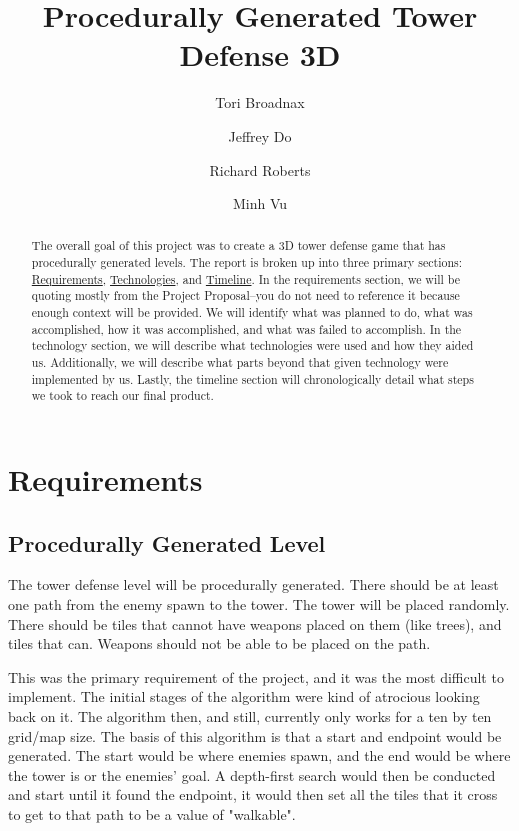 \documentclass{article}
\title{Procedurally Generated Tower Defense 3D}
\author[1]{Tori Broadnax}
\author[1]{Jeffrey Do}
\author[1]{Richard Roberts}
\author[1]{Minh Vu}
\affil[1]{George Mason University}
\begin{document}
\maketitle

\begin{abstract}
    The overall goal of this project was to create a 3D tower defense game that has procedurally generated levels. The report is broken up into three primary sections: \hyperref[sec:Requirements]{Requirements}, \hyperref[sec:Technologies]{Technologies}, and \hyperref[sec:Timeline]{Timeline}. In the requirements section, we will be quoting mostly from the Project Proposal--you do not need to reference it because enough context will be provided. We will identify what was planned to do, what was accomplished, how it was accomplished, and what was failed to accomplish. In the technology section, we will describe what technologies were used and how they aided us. Additionally, we will describe what parts beyond that given technology were implemented by us. Lastly, the timeline section will chronologically detail what steps we took to reach our final product.
\end{abstract}

\newpage

\tableofcontents

\newpage

\section{Requirements}
\label{sec:Requirements}

\subsection{Procedurally Generated Level}

\begin{displayquote}
    \small
    The tower defense level will be procedurally generated. There should be at least one path from the enemy spawn to the tower. The tower will be placed randomly. There should be tiles that cannot have weapons placed on them (like trees), and tiles that can. Weapons should not be able to be placed on the path.
\end{displayquote}

This was the primary requirement of the project, and it was the most difficult to implement. The initial stages of the algorithm were kind of atrocious looking back on it. The algorithm then, and still, currently only works for a ten by ten grid/map size. The basis of this algorithm is that a start and endpoint would be generated. The start would be where enemies spawn, and the end would be where the tower is or the enemies' goal. A depth-first search would then be conducted and start until it found the endpoint, it would then set all the tiles that it cross to get to that path to be a value of "walkable".
\end{document}
